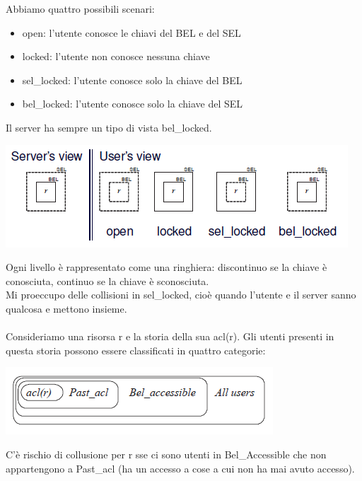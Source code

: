 Abbiamo quattro possibili scenari:
\begin{itemize}
    \item open: l'utente conosce le chiavi del BEL e del SEL
    \item locked: l'utente non conosce nessuna chiave
    \item sel\_locked: l'utente conosce solo la chiave del BEL
    \item bel\_locked: l'utente conosce solo la chiave del SEL
\end{itemize}
Il server ha sempre un tipo di vista bel\_locked.
\begin{center}
    \includegraphics[scale=0.7]{img/selbellock.png}
\end{center}
Ogni livello è rappresentato come una ringhiera: discontinuo se la chiave è conosciuta, continuo se la chiave è sconosciuta.\\
Mi proeccupo delle collisioni in sel\_locked, cioè quando l'utente e il server sanno qualcosa e mettono insieme.\\\\
Consideriamo una risorsa r e la storia della sua acl(r). Gli utenti presenti in questa storia possono essere classificati in quattro categorie:
\begin{center}
    \includegraphics[scale=0.6]{img/classuser.png}
\end{center}
C'è rischio di collusione per r sse ci sono utenti in Bel\_Accessible che non appartengono a Past\_acl (ha un accesso a cose a cui non ha mai avuto accesso).\\\\

